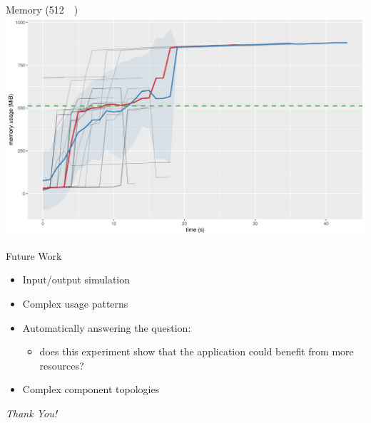 \documentclass{beamer}
\begin{document}
\begin{frame}{Memory (\SI{512}{\mebi\byte})}
  \includegraphics[width=\textwidth]{../../plots/heap_512.png}
\end{frame}


\begin{frame}{Future Work}
  \begin{itemize}
  \item Input/output simulation
  \item Complex usage patterns
  \item Automatically answering the question:
    \begin{itemize}
    \item does this experiment show that the application could benefit from more
      resources?
    \end{itemize}
  \item Complex component topologies
  \end{itemize}
  \pause
  \vfill
  \centering
  \large
  \emph{Thank You!}
\end{frame}

\end{document}
